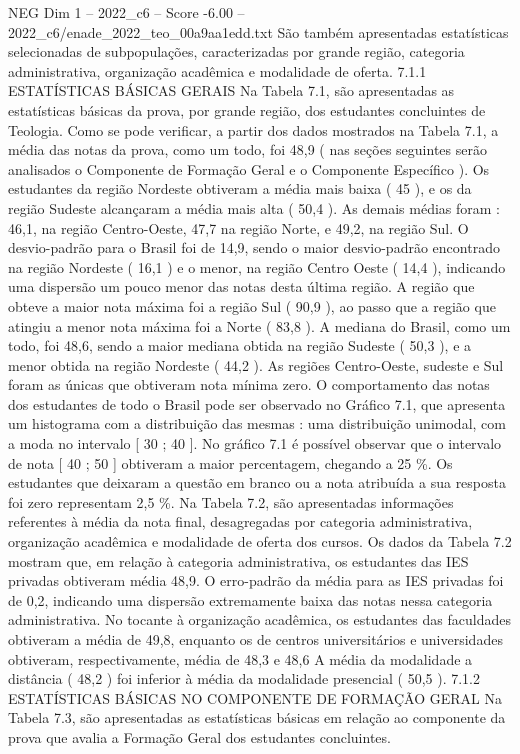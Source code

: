 \begin{textsample}{NEG Dim 1 – 2022\_c6 – Score -6.00 – 2022\_c6/enade\_2022\_teo\_00a9aa1edd.txt}
São também apresentadas estatísticas selecionadas de subpopulações, caracterizadas por grande região, categoria administrativa, organização acadêmica e modalidade de oferta. 7.1.1 ESTATÍSTICAS BÁSICAS GERAIS Na Tabela 7.1, são apresentadas as estatísticas básicas da prova, por grande região, dos estudantes concluintes de Teologia.
Como se pode verificar, a partir dos dados mostrados na Tabela 7.1, a média das notas da prova, como um todo, foi 48,9 ( nas seções seguintes serão analisados o Componente de Formação Geral e o Componente Específico ).
Os estudantes da região Nordeste obtiveram a média mais baixa ( 45 ), e os da região Sudeste alcançaram a média mais alta ( 50,4 ).
As demais médias foram : 46,1, na região Centro-Oeste, 47,7 na região Norte, e 49,2, na região Sul.
O desvio-padrão para o Brasil foi de 14,9, sendo o maior desvio-padrão encontrado na região Nordeste ( 16,1 ) e o menor, na região Centro Oeste ( 14,4 ), indicando uma dispersão um pouco menor das notas desta última região.
A região que obteve a maior nota máxima foi a região Sul ( 90,9 ), ao passo que a região que atingiu a menor nota máxima foi a Norte ( 83,8 ).
A mediana do Brasil, como um todo, foi 48,6, sendo a maior mediana obtida na região Sudeste ( 50,3 ), e a menor obtida na região Nordeste ( 44,2 ).
As regiões Centro-Oeste, sudeste e Sul foram as únicas que obtiveram nota mínima zero.
O comportamento das notas dos estudantes de todo o Brasil pode ser observado no Gráfico 7.1, que apresenta um histograma com a distribuição das mesmas : uma distribuição unimodal, com a moda no intervalo [ 30 ; 40 ].
No gráfico 7.1 é possível observar que o intervalo de nota [ 40 ; 50 ] obtiveram a maior percentagem, chegando a 25 \%.
Os estudantes que deixaram a questão em branco ou a nota atribuída a sua resposta foi zero representam 2,5 \%.
Na Tabela 7.2, são apresentadas informações referentes à média da nota final, desagregadas por categoria administrativa, organização acadêmica e modalidade de oferta dos cursos.
Os dados da Tabela 7.2 mostram que, em relação à categoria administrativa, os estudantes das IES privadas obtiveram média 48,9.
O erro-padrão da média para as IES privadas foi de 0,2, indicando uma dispersão extremamente baixa das notas nessa categoria administrativa.
No tocante à organização acadêmica, os estudantes das faculdades obtiveram a média de 49,8, enquanto os de centros universitários e universidades obtiveram, respectivamente, média de 48,3 e 48,6 A média da modalidade a distância ( 48,2 ) foi inferior à média da modalidade presencial ( 50,5 ). 7.1.2 ESTATÍSTICAS BÁSICAS NO COMPONENTE DE FORMAÇÃO GERAL Na Tabela 7.3, são apresentadas as estatísticas básicas em relação ao componente da prova que avalia a Formação Geral dos estudantes concluintes.

\end{textsample}
